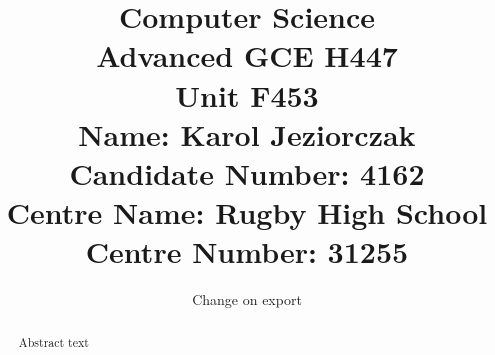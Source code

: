 \documentclass{report}
\begin{document}
\title{%
	Computer Science \\ Advanced GCE H447 \\ Unit F453 \\[2\baselineskip]
	\large Name: Karol Jeziorczak \\ Candidate Number: 4162 \\ Centre Name: Rugby High School \\ Centre Number: 31255 }
\date{Change on export}
\maketitle
\pagebreak
\tableofcontents
\begin{abstract}
Abstract text
\end{abstract}
\end{document}
